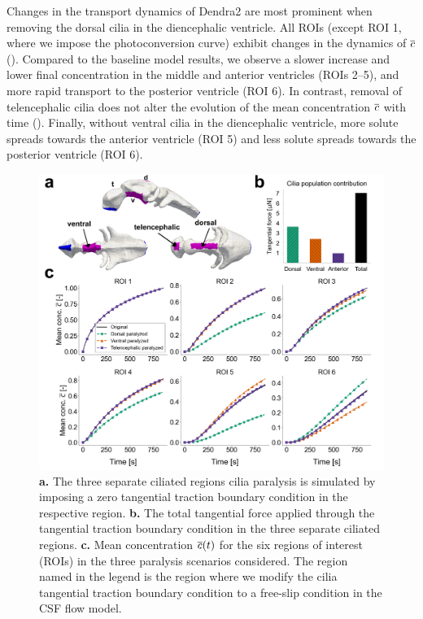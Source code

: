 \documentclass{WileyMSP-template}
\begin{document}
Changes in the transport dynamics of Dendra2 are most prominent when removing the dorsal cilia
in the diencephalic ventricle. All ROIs (except ROI 1, where we impose the photoconversion curve)
exhibit changes in the dynamics of $\overline{c}$ ().
Compared to the baseline model results, we observe a slower increase and lower final concentration
in the middle and anterior ventricles (ROIs 2--5),
and more rapid transport to the posterior ventricle (ROI 6).
In contrast, removal of telencephalic cilia does not alter the evolution of the
mean concentration $\overline{c}$ with time ().
Finally, without ventral cilia in the diencephalic ventricle,
more solute spreads towards the anterior ventricle (ROI 5) and
less solute spreads towards the posterior ventricle (ROI 6).
\begin{figure}[H]
    \centering
    \includegraphics[width=\textwidth]{graphics/figure5_compare_cilia_modifications.png}
    \caption{\textbf{a.} The three separate ciliated regions cilia paralysis is simulated
    by imposing a zero tangential traction boundary condition in the respective region.
    \textbf{b.} The total tangential force applied through the tangential traction
    boundary condition in the three separate ciliated regions.
    \textbf{c.} Mean concentration $\overline{c}(t)$ for the six regions of interest (ROIs) in the three 
    paralysis scenarios considered. The region named in the legend is the region
    where we modify the cilia tangential traction boundary condition to a free-slip condition
    in the CSF flow model.}
    \label{fig:fig5}
\end{figure}
\end{document}
